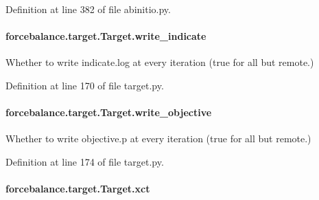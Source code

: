 Definition at line 382 of file abinitio.\-py.

\hypertarget{classforcebalance_1_1target_1_1Target_a3a2f5d4bbb8d6ecb580eadb261977a57}{
\paragraph[{write\-\_\-indicate}]{\setlength{\rightskip}{0pt plus 5cm}forcebalance.\-target.\-Target.\-write\-\_\-indicate\hspace{0.3cm}{\ttfamily [inherited]}}}\label{classforcebalance_1_1target_1_1Target_a3a2f5d4bbb8d6ecb580eadb261977a57}


Whether to write indicate.\-log at every iteration (true for all but remote.) 



Definition at line 170 of file target.\-py.

\hypertarget{classforcebalance_1_1target_1_1Target_a7a95624dfe03f0cee0e5f1ae09db306a}{
\paragraph[{write\-\_\-objective}]{\setlength{\rightskip}{0pt plus 5cm}forcebalance.\-target.\-Target.\-write\-\_\-objective\hspace{0.3cm}{\ttfamily [inherited]}}}\label{classforcebalance_1_1target_1_1Target_a7a95624dfe03f0cee0e5f1ae09db306a}


Whether to write objective.\-p at every iteration (true for all but remote.) 



Definition at line 174 of file target.\-py.

\hypertarget{classforcebalance_1_1target_1_1Target_aad2e385cfbf7b4a68f1c2cb41133fe82}{
\paragraph[{xct}]{\setlength{\rightskip}{0pt plus 5cm}forcebalance.\-target.\-Target.\-xct\hspace{0.3cm}{\ttfamily [inherited]}}}\label{classforcebalance_1_1target_1_1Target_aad2e385cfbf7b4a68f1c2cb41133fe82}


